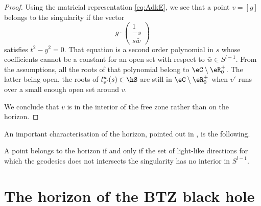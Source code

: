 \begin{proof}
	Using the matricial representation \eqref{eq:AdkE}, we see that a point $v=[g]$ belongs to the singularity if the vector
	\begin{equation}
		g\cdot \begin{pmatrix}
			1	\\ 
			-s	\\ 
			s\bar w	
		\end{pmatrix}
	\end{equation}
	satisfies $t^2-y^2=0$. That equation is a second order polynomial in $s$ whose coefficients cannot be a constant for an open set with respect to $\bar w\in S^{l-1}$. From the assumptions, all the roots of that polynomial belong to $\eC\setminus\eR^+_0$. The latter being open, the roots of $l_{v'}^w(s)\in\hS$ are still in $\eC\setminus\eR^+_0$ when $v'$ runs over a small enough open set around $v$.

	We conclude that $v$ is in the interior of the free zone rather than on the horizon.
\end{proof}

An important characterisation of the horizon, pointed out in \cite{Keio}, is the following.
\begin{theorem}		\label{ThoHorIntDansS}
	A point belongs to the horizon if and only if the set of light-like directions for which the geodesics does not intersects the singularity has no interior in $S^{l-1}$.
\end{theorem}


\section{The horizon of the BTZ black hole}
\label{SecNewWithMatrices}


